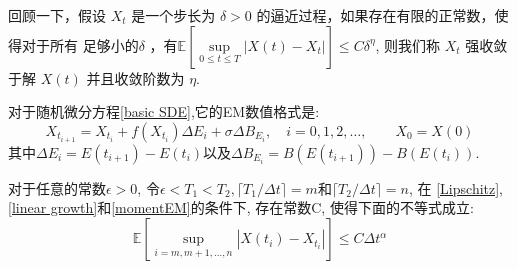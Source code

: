 回顾一下，假设 \( X_t\) 是一个步长为 \( \delta > 0 \) 的逼近过程，如果存在有限的正常数，使得对于所有 足够小的\( \delta \) ，有$\mathbb{E} \left[\sup\limits_{0\le t \le T}|X(t) - X_t|\right] \leq C\delta^{\eta}$, 则我们称 \( X_t \) 强收敛于解 \( X(t) \) 并且收敛阶数为 \( \eta \).

对于随机微分方程\cref{basic SDE},它的EM数值格式是:
\begin{equation}\label{EMmethod}
	X_{t_{i+1}}=X_{t_i}+f(X_{t_{i}})\Delta E_{i}+\sigma\Delta B_{E_{i}},\quad i=0,1,2,\ldots,\qquad X_0=X(0)
\end{equation}
其中$\Delta E_{i}=E(t_{i+1})-E(t_i)$以及$\Delta B_{E_{i}}=B(E{(t_{i+1})})-B(E({t_i}))$.

\begin{theorem}\label{main th EM}
	对于任意的常数$\epsilon>0$, 令$\epsilon < T_1 < T_2, \lceil T_1/\Delta t \rceil = m$和$\lceil T_2/\Delta t \rceil = n$, 在 \textnormal{\cref{Lipschitz}}, \textnormal{\cref{linear growth}}和\textnormal{\cref{momentEM}}的条件下, 存在常数C, 使得下面的不等式成立:
	$$\mathbb{E}\left[\sup\limits_{i = m,m+1,\ldots ,n} |X({t_i})-X_{t_i}|\right]\le C\Delta t^\alpha$$
\end{theorem}

